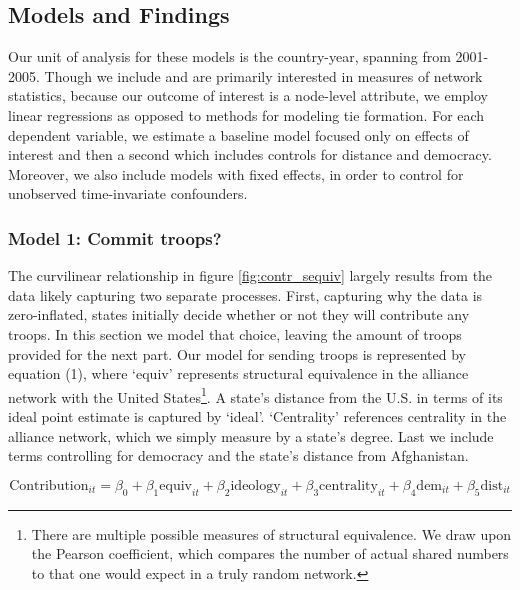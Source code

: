 \documentclass[12pt,letterpaper]{article}
\begin{document}
	\subsection{Models and Findings}
	 Our unit of analysis for these models is the country-year, spanning from 2001-2005. Though we include and are primarily interested in measures of network statistics, because our outcome of interest is a node-level attribute, we employ linear regressions as opposed to methods for modeling tie formation. For each dependent variable, we estimate a baseline model focused only on effects of interest and then a second which includes controls for distance and democracy. Moreover, we also include models with fixed effects, in order to control for unobserved time-invariate confounders.

		\subsubsection{Model 1: Commit troops?}

		The curvilinear relationship in figure \ref{fig:contr_sequiv} largely results from the data likely capturing two separate processes. First, capturing why the data is zero-inflated, states initially decide whether or not they will contribute any troops. In this section we model that choice, leaving the amount of troops provided for the next part. Our model for sending troops is represented by equation (1), where `equiv' represents structural equivalence in the alliance network with the United States\footnote{There are multiple possible measures of structural equivalence. We draw upon the Pearson coefficient, which compares the number of actual shared numbers to that one would expect in a truly random network.}. A state's distance from the U.S. in terms of its ideal point estimate is captured by `ideal'. `Centrality' references centrality in the alliance network, which we simply measure by a state's degree. Last we include terms controlling for democracy and the state's distance from Afghanistan.

		\vspace{-3em}
			\begin{equation}
				\text{Contribution}_{it} = \beta_0 + \beta_1\text{equiv}_{it} + \beta_2\text{ideology}_{it} + \beta_3\text{centrality}_{it} + \beta_4\text{dem}_{it} + \beta_5\text{dist}_{it}
			\end{equation}
\end{document}
